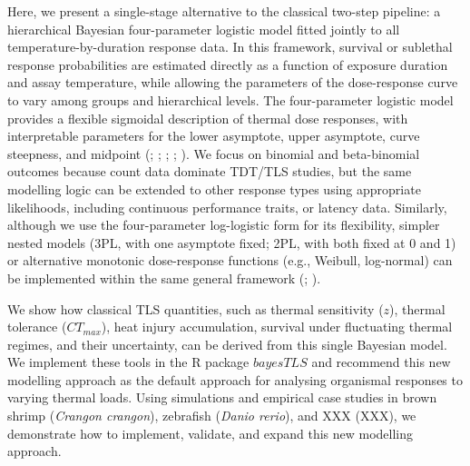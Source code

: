 \documentclass[
  11pt,
]{article}
\begin{document}
Here, we present a single-stage alternative to the classical two-step
pipeline: a hierarchical Bayesian four-parameter logistic model fitted
jointly to all temperature-by-duration response data. In this framework,
survival or sublethal response probabilities are estimated directly as a
function of exposure duration and assay temperature, while allowing the
parameters of the dose-response curve to vary among groups and
hierarchical levels. The four-parameter logistic model provides a
flexible sigmoidal description of thermal dose responses, with
interpretable parameters for the lower asymptote, upper asymptote, curve
steepness, and midpoint (; ;
;
;
). We focus
on binomial and beta-binomial outcomes because count data dominate
TDT/TLS studies, but the same modelling logic can be extended to other
response types using appropriate likelihoods, including continuous
performance traits, or latency data. Similarly, although we use the
four-parameter log-logistic form for its flexibility, simpler nested
models (3PL, with one asymptote fixed; 2PL, with both fixed at 0 and 1)
or alternative monotonic dose-response functions (e.g., Weibull,
log-normal) can be implemented within the same general framework
(;
).

We show how classical TLS quantities, such as thermal sensitivity
(\(z\)), thermal tolerance (\(CT_{max}\)), heat injury accumulation,
survival under fluctuating thermal regimes, and their uncertainty, can
be derived from this single Bayesian model. We implement these tools in
the R package \(bayesTLS\) and recommend this new modelling approach as
the default approach for analysing organismal responses to varying
thermal loads. Using simulations and empirical case studies in brown
shrimp (\emph{Crangon crangon}), zebrafish (\emph{Danio rerio}), and XXX
(XXX), we demonstrate how to implement, validate, and expand this new
modelling approach.
\end{document}
